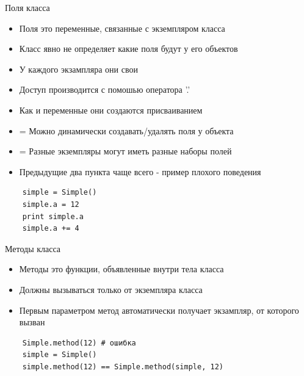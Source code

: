 \documentclass{article}
\begin{document}
\begin{center} Поля класса \end{center}
\begin{itemize}
    \item Поля это переменные, связанные с экземпляром класса
    \item Класс явно не определяет какие поля будут у его объектов
    \item У каждого экзампляра они свои
    \item Доступ производится с помошью оператора '.'
    \item Как и переменные они создаются присваиванием
    \item = Можно динамически создавать/удалять поля у объекта
    \item = Разные экземпляры могут иметь разные наборы полей
    \item Предыдущие два пункта чаще всего - пример плохого поведения
\end{itemize}
\begin{lstlisting}
    simple = Simple()
    simple.a = 12
    print simple.a
    simple.a += 4
\end{lstlisting}
\newpage

\begin{center} Методы класса\end{center}
\begin{itemize}
    \item Методы это функции, объявленные внутри тела класса
    \item Должны вызываться только от экземпляра класса
    \item Первым параметром метод автоматически получает экзампляр, от которого вызван
\end{itemize}

\begin{lstlisting}
    Simple.method(12) # ошибка
    simple = Simple()
    simple.method(12) == Simple.method(simple, 12)
\end{lstlisting}
\newpage
\end{document}
